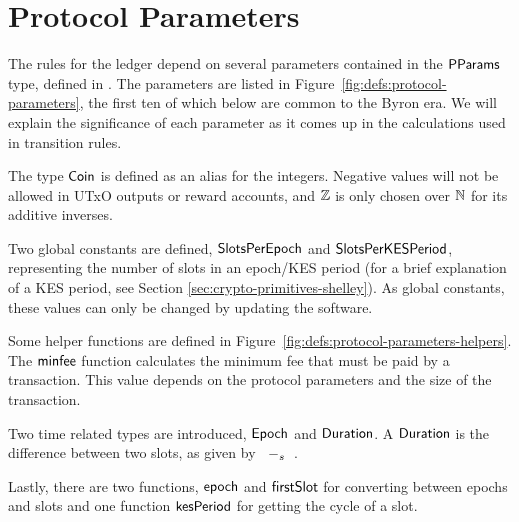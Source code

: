 \section{Protocol Parameters}
\label{sec:protocol-parameters}

The rules for the ledger depend on several parameters contained in the $\mathsf{PParams}$ type,
defined in \cite{byron_ledger_spec}.
The parameters are listed in Figure~\ref{fig:defs:protocol-parameters},
the first ten of which below are common to the Byron era.
We will explain the significance of each parameter as it comes up in
the calculations used in transition rules.

The type $\mathsf{Coin}$ is defined as an alias for the integers.
Negative values will not be allowed in UTxO outputs or reward accounts,
and $\mathbb{Z}$ is only chosen over $\mathbb{N}$ for its additive inverses.

Two global constants are defined, $\mathsf{SlotsPerEpoch}$ and $\mathsf{SlotsPerKESPeriod}$,
representing the number of slots in an epoch/KES period (for a brief explanation
of a KES period, see Section \ref{sec:crypto-primitives-shelley}).
As global constants, these values can only be
changed by updating the software.

Some helper functions are defined in Figure~\ref{fig:defs:protocol-parameters-helpers}.
The $\mathsf{minfee}$ function calculates the minimum fee that must be paid by a transaction.
This value depends on the protocol parameters and the size of the transaction.

Two time related types are introduced, $\mathsf{Epoch}$ and $\mathsf{Duration}$.
A $\mathsf{Duration}$ is the difference between two slots, as given by $\mathit{}~-_{s}~\mathit{}$.

Lastly, there are two functions, $\mathsf{epoch}$ and $\mathsf{firstSlot}$ for converting
between epochs and slots and one function $\mathsf{kesPeriod}$ for getting the cycle of a slot.

